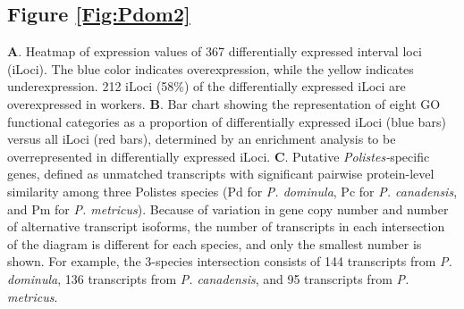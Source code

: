 \subsection*{Figure \ref{Fig:Pdom2}}
\noindent
\textbf{A}. Heatmap of expression values of 367 differentially expressed interval loci (iLoci). The blue color indicates overexpression, while the yellow indicates underexpression. 212 iLoci (58\%) of the differentially expressed iLoci are overexpressed in workers.
\textbf{B}. Bar chart showing the representation of eight GO functional categories as a proportion of differentially expressed iLoci (blue bars) versus all iLoci (red bars), determined by an enrichment analysis to be overrepresented in differentially expressed iLoci.
\textbf{C}. Putative \textit{Polistes-}specific genes, defined as unmatched transcripts with significant pairwise protein-level similarity among three Polistes species (Pd for \textit{P. dominula}, Pc for \textit{P. canadensis}, and Pm for \textit{P. metricus}). Because of variation in gene copy number and number of alternative transcript isoforms, the number of transcripts in each intersection of the diagram is different for each species, and only the smallest number is shown. For example, the 3-species intersection consists of 144 transcripts from \textit{P. dominula}, 136 transcripts from \textit{P. canadensis}, and 95 transcripts from \textit{P. metricus}.


